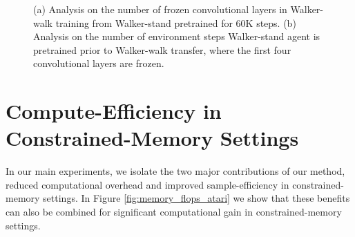 \documentclass{article}
\begin{document}
\begin{figure} [t] \centering
{} 
\caption{(a) Analysis on the number of frozen convolutional layers in Walker-walk training from Walker-stand pretrained for 60K steps. (b) Analysis on the number of environment steps Walker-stand agent is pretrained prior to Walker-walk transfer, where the first four convolutional layers are frozen.} \label{fig:transfer_dmc_ablation}
\end{figure}














\section{Compute-Efficiency in Constrained-Memory Settings} \label{appendix:additional_figures1}
In our main experiments, we isolate the two major contributions of our method, reduced computational overhead and improved sample-efficiency in constrained-memory settings. In Figure \ref{fig:memory_flops_atari} we show that these benefits can also be combined for significant computational gain in constrained-memory settings. 

\begin{figure*} [t] \centering
{} 
\\
\caption{Comparison of Rainbow in constrained-memory settings with and without SEER, where the x-axis shows estimated cumulative FLOPs, corresponding to Figure \ref{fig:memory_atari}. The dotted gray line denotes the encoder freezing time . The solid line and shaded regions represent the mean and standard deviation, respectively, across five runs.} \label{fig:memory_flops_atari}
\end{figure*}
\end{document}
